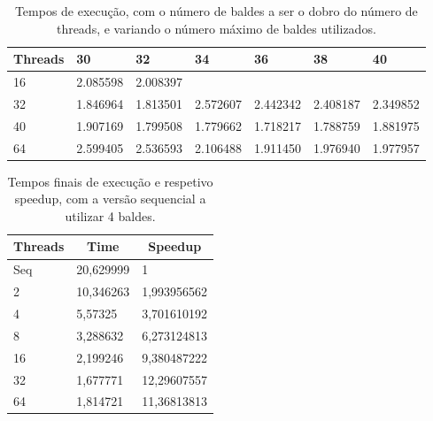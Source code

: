 \documentclass[a4paper]{report}
\begin{document}
\begin{table}[h]
\centering
\begin{tabular}{|l|l|l|l|l|l|l|}
\hline
Threads & 30       & 32       & 34       & 36       & 38       & 40       \\ \hline
16      & 2.085598 & 2.008397 &          &          &          &          \\ \hline
32      & 1.846964 & 1.813501 & 2.572607 & 2.442342 & 2.408187 & 2.349852 \\ \hline
40      & 1.907169 & 1.799508 & 1.779662 & 1.718217 & 1.788759 & 1.881975 \\ \hline
64      & 2.599405 & 2.536593 & 2.106488 & 1.911450 & 1.976940 & 1.977957 \\ \hline
\end{tabular}
\caption{\label{tab:cutoff}Tempos de execução, com o número de baldes a ser o
    dobro do número de threads, e variando o número máximo de baldes
    utilizados.}
\end{table}

\begin{table}[h]
\centering
\begin{tabular}{|l|l|l|}
\hline
\multicolumn{1}{|c|}{Threads} & \multicolumn{1}{c|}{Time} & \multicolumn{1}{c|}{Speedup} \\ \hline
Seq                           & 20,629999                 & 1                            \\ \hline
2                             & 10,346263                 & 1,993956562                  \\ \hline
4                             & 5,57325                   & 3,701610192                  \\ \hline
8                             & 3,288632                  & 6,273124813                  \\ \hline
16                            & 2,199246                  & 9,380487222                  \\ \hline
32                            & 1,677771                  & 12,29607557                  \\ \hline
64                            & 1,814721                  & 11,36813813                  \\ \hline
\end{tabular}
\caption{\label{tab:final}Tempos finais de execução e respetivo speedup, com a
    versão sequencial a utilizar 4 baldes.}
\end{table}
\end{document}
